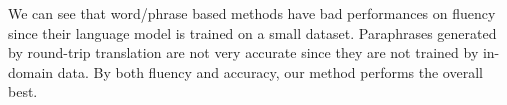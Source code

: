 We can see that word/phrase based methods have bad performances on fluency since their language model is trained on a small dataset. Paraphrases generated by round-trip translation are not very accurate since they are not trained by in-domain data. By both fluency and accuracy, our method performs the overall best.
